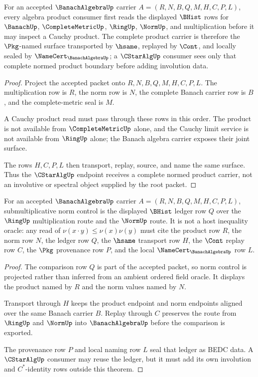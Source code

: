 \begin{theorem}
\label{thm:banach-algebra-complete-product-carrier}
For an accepted $\BanachAlgebraUp$ carrier $A=(R,N,B,Q,M,H,C,P,L)$, every algebra product consumer first reads the displayed $\BHist$ rows for $\BanachUp$, $\CompleteMetricUp$, $\RingUp$, $\NormUp$, and multiplication before it may inspect a Cauchy product. The complete product carrier is therefore the $\Pkg$-named surface transported by $\hsame$, replayed by $\Cont$, and locally sealed by $\NameCert_{\BanachAlgebraUp}$; a $\CStarAlgUp$ consumer sees only that complete normed product boundary before adding involution data.
\end{theorem}
\begin{proof}
Project the accepted packet onto $R,N,B,Q,M,H,C,P,L$. The multiplication row is $R$, the norm row is $N$, the complete Banach carrier row is $B$, and the complete-metric seal is $M$.

A Cauchy product read must pass through these rows in this order. The product is not available from $\CompleteMetricUp$ alone, and the Cauchy limit service is not available from $\RingUp$ alone; the Banach algebra carrier exposes their joint surface.

The rows $H,C,P,L$ then transport, replay, source, and name the same surface. Thus the $\CStarAlgUp$ endpoint receives a complete normed product carrier, not an involutive or spectral object supplied by the root packet.
\end{proof}

\begin{theorem}
\label{thm:banach-algebra-norm-submultiplicativity-ledger}
For an accepted $\BanachAlgebraUp$ carrier $A=(R,N,B,Q,M,H,C,P,L)$, submultiplicative norm control is the displayed $\BHist$ ledger row $Q$ over the $\RingUp$ multiplication route and the $\NormUp$ route. It is not a host inequality oracle: any read of $\nu(x\cdot y)\leq \nu(x)\nu(y)$ must cite the product row $R$, the norm row $N$, the ledger row $Q$, the $\hsame$ transport row $H$, the $\Cont$ replay row $C$, the $\Pkg$ provenance row $P$, and the local $\NameCert_{\BanachAlgebraUp}$ row $L$.
\end{theorem}
\begin{proof}
The comparison row $Q$ is part of the accepted packet, so norm control is projected rather than inferred from an ambient ordered field oracle. It displays the product named by $R$ and the norm values named by $N$.

Transport through $H$ keeps the product endpoint and norm endpoints aligned over the same Banach carrier $B$. Replay through $C$ preserves the route from $\RingUp$ and $\NormUp$ into $\BanachAlgebraUp$ before the comparison is exported.

The provenance row $P$ and local naming row $L$ seal that ledger as BEDC data. A $\CStarAlgUp$ consumer may reuse the ledger, but it must add its own involution and $C^*$-identity rows outside this theorem.
\end{proof}

